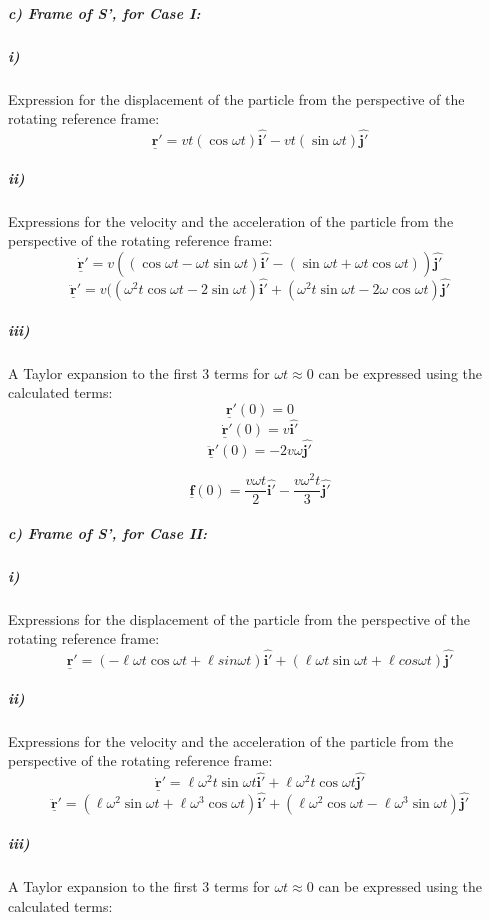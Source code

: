 \documentclass[a4paper,11pt]{scrartcl}
\begin{document}
\subparagraph{c) Frame of S', for Case I:}
\subparagraph{i)} 
Expression for the displacement of the particle from the perspective of the rotating reference frame: 
\begin{equation}
 \underline{\mathbf{r}}'=vt(\cos{\omega}t)\hat{\mathbf{i'}}-vt(\sin{\omega}t)\hat{\mathbf{j'}}
\end{equation}
\subparagraph{ii)} 
Expressions for the velocity and the acceleration of the particle from the perspective of the rotating reference frame: 
\begin{equation}
 \dot{\underline{\mathbf{r}}}'=v((\cos{\omega}t-{\omega}t\sin{\omega}t)\hat{\mathbf{i'}}-(\sin{\omega}t+{\omega}t\cos{\omega}t))\hat{\mathbf{j'}}
\end{equation}
\begin{equation}
 \ddot{\underline{\mathbf{r}}}'=v(({\omega}^2t\cos{\omega}t-2\sin{\omega}t)\hat{\mathbf{i'}}+({\omega}^2t\sin{\omega}t-2{\omega}\cos{\omega}t)\hat{\mathbf{j'}}
\end{equation}
\subparagraph{iii)}
A Taylor expansion to the first 3 terms for ${\omega}t\approx0$ can be expressed using the calculated terms:
 \begin{equation}
 \underline{\mathbf{r}}'(0)=0
\end{equation}
\begin{equation}
 \dot{\underline{\mathbf{r}}}'(0)=v\hat{\mathbf{i'}}
\end{equation}
\begin{equation}
 \ddot{\underline{\mathbf{r}}}'(0)=-2v{\omega}\hat{\mathbf{j'}}
\end{equation}

\begin{equation}
 \underline{\mathbf{f}}(0)=\frac{v{\omega}t}{2}\hat{\mathbf{i'}}-\frac{v{\omega}^2t}{3}\hat{\mathbf{j'}}
\end{equation}

\subparagraph{c) Frame of S', for Case II:}
\subparagraph{i)}
Expressions for the displacement of the particle from the perspective of the rotating reference frame: 
 \begin{equation}
 \underline{\mathbf{r}}'=(-\ell{\omega}t{\cos{\omega}t}+\ell{sin{\omega}t})\hat{\mathbf{i'}}+(\ell{\omega}t{\sin{\omega}t}+\ell{cos{\omega}t})\hat{\mathbf{j'}}
\end{equation}
\subparagraph{ii)} 
Expressions for the velocity and the acceleration of the particle from the perspective of the rotating reference frame:
\begin{equation}
\dot{\underline{\mathbf{r}}}'=\ell{\omega}^2t\sin{\omega}t\hat{\mathbf{i'}}+\ell{\omega}^2t\cos{\omega}t\hat{\mathbf{j'}}
\end{equation}
\begin{equation}
 \ddot{\underline{\mathbf{r}}}'=(\ell{\omega}^2\sin{\omega}t+\ell{\omega}^3\cos{\omega}t)\hat{\mathbf{i'}}+(\ell{\omega}^2\cos{\omega}t-\ell{\omega}^3\sin{\omega}t)\hat{\mathbf{j'}}
\end{equation}
\subparagraph{iii)}
A Taylor expansion to the first 3 terms for ${\omega}t\approx0$ can be expressed using the calculated terms:
\end{document}
